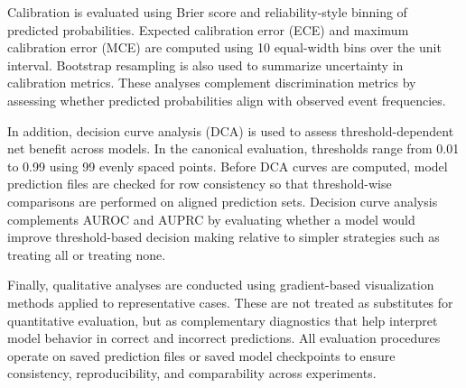 Calibration is evaluated using Brier score and reliability-style binning of predicted probabilities. Expected calibration error (ECE) and maximum calibration error (MCE) are computed using 10 equal-width bins over the unit interval. Bootstrap resampling is also used to summarize uncertainty in calibration metrics. These analyses complement discrimination metrics by assessing whether predicted probabilities align with observed event frequencies.

In addition, decision curve analysis (DCA) is used to assess threshold-dependent net benefit across models. In the canonical evaluation, thresholds range from 0.01 to 0.99 using 99 evenly spaced points. Before DCA curves are computed, model prediction files are checked for row consistency so that threshold-wise comparisons are performed on aligned prediction sets. Decision curve analysis complements AUROC and AUPRC by evaluating whether a model would improve threshold-based decision making relative to simpler strategies such as treating all or treating none.

Finally, qualitative analyses are conducted using gradient-based visualization methods applied to representative cases. These are not treated as substitutes for quantitative evaluation, but as complementary diagnostics that help interpret model behavior in correct and incorrect predictions. All evaluation procedures operate on saved prediction files or saved model checkpoints to ensure consistency, reproducibility, and comparability across experiments.